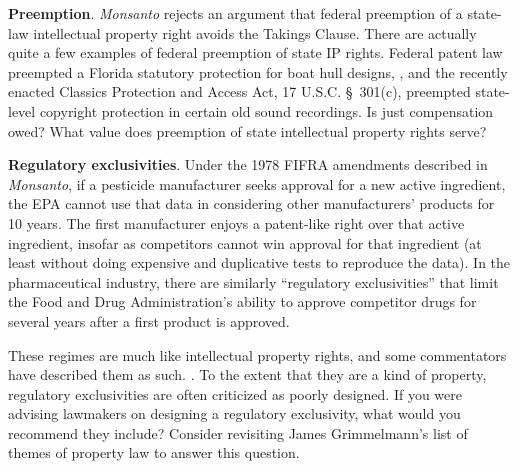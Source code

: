 \item \textbf{Preemption}. \emph{Monsanto} rejects an argument that federal
preemption of a state-law intellectual property right avoids the Takings Clause.
There are actually quite a few examples of federal preemption of state IP
rights. Federal patent law preempted a Florida statutory protection for boat
hull designs, , and the recently enacted Classics
Protection and Access Act, 17 U.S.C. \S~301(c), preempted state-level copyright
protection in certain old sound recordings. Is just compensation owed? What
value does preemption of state intellectual property rights serve?


\item \textbf{Regulatory exclusivities}. Under the 1978 FIFRA amendments
described in \emph{Monsanto}, if a pesticide manufacturer seeks approval for a
new active ingredient, the EPA cannot use that data in considering other
manufacturers' products for 10 years. The first manufacturer enjoys a
patent-like right over that active ingredient, insofar as competitors cannot win
approval for that ingredient (at least without doing expensive and duplicative
tests to reproduce the data). In the pharmaceutical industry, there are
similarly ``regulatory exclusivities'' that limit the Food and Drug
Administration's ability to approve competitor drugs for several years after
a first product is approved.


These regimes are much like intellectual property rights, and some commentators
have described them as such. .
To the extent that they are a kind of property, regulatory exclusivities are
often criticized as poorly designed. If you were advising lawmakers on designing
a regulatory exclusivity, what would you recommend they include? Consider
revisiting James Grimmelmann's list of themes of property law to answer this
question.



